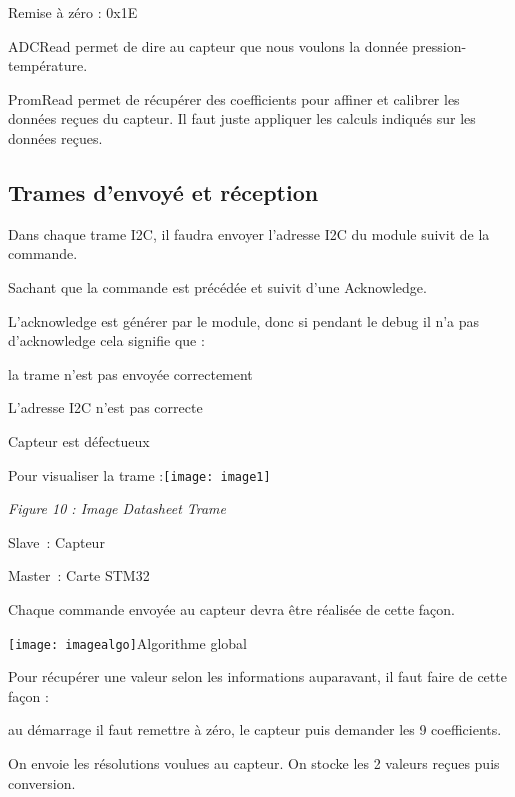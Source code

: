 \noindent Remise \`{a} z\'{e}ro : 0x1E

\noindent ADCRead permet de dire au capteur que nous voulons la donn\'{e}e pression-temp\'{e}rature.

\noindent PromRead permet de r\'{e}cup\'{e}rer des coefficients pour affiner et calibrer les donn\'{e}es re\c{c}ues du capteur. Il faut juste appliquer les calculs indiqu\'{e}s sur les donn\'{e}es re\c{c}ues.\underbar{}

\noindent 
\subsection{Trames d'envoy\'{e} et r\'{e}ception}

\noindent 

\noindent Dans chaque trame I2C, il faudra envoyer l'adresse I2C du module suivit de la commande.

\noindent Sachant que la commande est pr\'{e}c\'{e}d\'{e}e et suivit d'une Acknowledge.

\noindent L'acknowledge est g\'{e}n\'{e}rer par le module, donc si pendant le debug il n'a pas d'acknowledge cela signifie que :

\noindent  la trame n'est pas envoy\'{e}e correctement

\noindent  L'adresse I2C n'est pas correcte

\noindent  Capteur est d\'{e}fectueux

\noindent Pour visualiser la trame :\texttt{[image: image1]}

\noindent \textit{Figure 10 : Image Datasheet Trame}

\noindent 

\noindent Slave~: Capteur

\noindent Master~: Carte STM32

\noindent Chaque commande envoy\'{e}e au capteur devra \^{e}tre r\'{e}alis\'{e}e de cette fa\c{c}on.

\noindent 

\noindent \texttt{[image: imagealgo]}Algorithme global

\noindent Pour r\'{e}cup\'{e}rer une valeur selon les informations auparavant, il faut faire de cette fa\c{c}on :

\noindent au d\'{e}marrage il faut remettre \`{a} z\'{e}ro, le capteur puis demander les 9 coefficients.

\noindent On envoie les r\'{e}solutions voulues au capteur. On stocke les 2 valeurs re\c{c}ues puis conversion.

